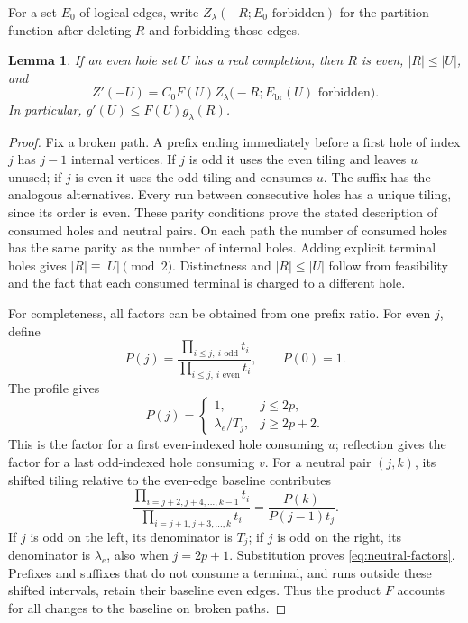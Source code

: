 \documentclass[11pt]{article}
\newtheorem{lemma}[theorem]{Lemma}
\theoremstyle{definition}
\theoremstyle{remark}
\numberwithin{equation}{section}
\begin{document}
For a set $E_0$ of logical edges, write
$Z_\lambda(-R;E_0\text{ forbidden})$ for the partition function
after deleting $R$ and forbidding those edges.

\begin{lemma}\label{lem:deletion-accounting}
If an even hole set $U$ has a real completion, then $R$ is even,
$|R|\le|U|$, and
\begin{equation}\label{eq:deletion-identity}
 Z'(-U)
 =C_0 F(U)
 Z_\lambda\bigl(-R;E_{\mathrm{br}}(U)\text{ forbidden}\bigr).
\end{equation}
In particular,
$g'(U)\le F(U)g_\lambda(R)$.
\end{lemma}

\begin{proof}
Fix a broken path. A prefix ending immediately before a first hole
of index $j$ has $j-1$ internal vertices. If $j$ is odd it uses the
even tiling and leaves $u$ unused; if $j$ is even it uses the odd
tiling and consumes $u$. The suffix has the analogous alternatives.
Every run between consecutive holes has a unique tiling, since its
order is even. These parity conditions prove the stated description
of consumed holes and neutral pairs. On each path the number of
consumed holes has the same parity as the number of internal holes.
Adding explicit terminal holes gives $|R|\equiv|U|\pmod2$.
Distinctness and $|R|\le|U|$ follow from feasibility and the fact
that each consumed terminal is charged to a different hole.

For completeness, all factors can be obtained from one prefix
ratio. For even $j$, define
\[
 P(j)=
 \frac{\prod_{i\le j,\ i\text{ odd}}t_i}
      {\prod_{i\le j,\ i\text{ even}}t_i},
 \qquad P(0)=1.
\]
The profile gives
\[
 P(j)=
 \begin{cases}
 1,&j\le2p,\\
 \lambda_e/T_j,&j\ge2p+2.
 \end{cases}
\]
This is the factor for a first even-indexed hole consuming $u$;
reflection gives the factor for a last odd-indexed hole consuming
$v$. For a neutral pair $(j,k)$, its shifted tiling relative to
the even-edge baseline contributes
\[
 \frac{\prod_{i=j+2,j+4,\ldots,k-1}t_i}
      {\prod_{i=j+1,j+3,\ldots,k}t_i}
 =
 \frac{P(k)}{P(j-1)t_j}.
\]
If $j$ is odd on the left, its denominator is $T_j$; if $j$ is odd
on the right, its denominator is $\lambda_e$, also when
$j=2p+1$. Substitution proves \cref{eq:neutral-factors}.
Prefixes and suffixes that do not consume a terminal, and runs
outside these shifted intervals, retain their baseline even edges.
Thus the product $F$ accounts for all changes to the baseline
on broken paths.


\end{proof}
\end{document}
